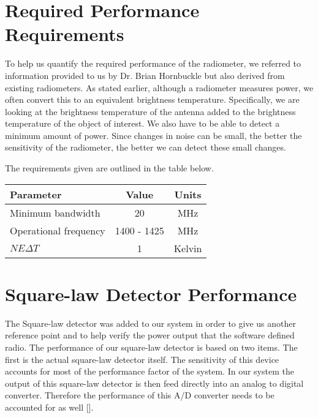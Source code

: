 \section{Required Performance Requirements}

To help us quantify the required performance of the radiometer, we referred to information provided to us by Dr. Brian Hornbuckle but also derived from existing radiometers.  As stated earlier, although a radiometer measures power, we often convert this to an equivalent brightness temperature.  Specifically, we are looking at the brightness temperature of the antenna added to the brightness temperature of the object of interest.  We also have to be able to detect a minimum amount of power.  Since changes in noise can be small, the better the sensitivity of the radiometer, the better we can detect these small changes.  

The requirements given are outlined in the table below.

\begin{table}[h!tb] \centering
{}
\label{rad_performance}
\begin{tabular}{lcc} \hline
\textbf{Parameter} & \textbf{Value} & \textbf{Units} \\ \hline
Minimum bandwidth & 20 & MHz \\
Operational frequency & 1400 - 1425 & MHz \\
$NE\Delta T$ & 1 & Kelvin \\ \hline
\end{tabular}
\end{table}

\section{Square-law Detector Performance}
The Square-law detector was added to our system in order to give us another reference point and to help verify the power output that the software defined radio.  The performance of our square-law detector is based on two items.  The first is the actual square-law detector itself.  The sensitivity of this device accounts for most of the performance factor of the system.  In our system the output of this square-law detector is then feed directly into an analog to digital converter.  Therefore the performance of this A/D converter needs to be accounted for as well [\cite{Terlep}].  


